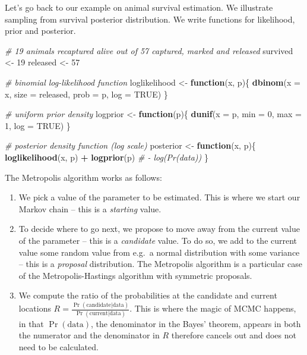 \documentclass[
  12pt,
]{krantz}
\newenvironment{Shaded}{\begin{snugshade}}{\end{snugshade}}
\newcommand{\AttributeTok}[1]{\textcolor[rgb]{0.13,0.29,0.53}{#1}}
\newcommand{\CommentTok}[1]{\textcolor[rgb]{0.56,0.35,0.01}{\textit{#1}}}
\newcommand{\ConstantTok}[1]{\textcolor[rgb]{0.56,0.35,0.01}{#1}}
\newcommand{\ControlFlowTok}[1]{\textcolor[rgb]{0.13,0.29,0.53}{\textbf{#1}}}
\newcommand{\DecValTok}[1]{\textcolor[rgb]{0.00,0.00,0.81}{#1}}
\newcommand{\FunctionTok}[1]{\textcolor[rgb]{0.13,0.29,0.53}{\textbf{#1}}}
\newcommand{\NormalTok}[1]{#1}
\newcommand{\OtherTok}[1]{\textcolor[rgb]{0.56,0.35,0.01}{#1}}
\newcommand{\SpecialCharTok}[1]{\textcolor[rgb]{0.81,0.36,0.00}{\textbf{#1}}}
\begin{document}
Let's go back to our example on animal survival estimation. We illustrate sampling from survival posterior distribution. We write functions for likelihood, prior and posterior.

\begin{Shaded}
\begin{Highlighting}[]
\CommentTok{\# 19 animals recaptured alive out of 57 captured, marked and released}
\NormalTok{survived }\OtherTok{\textless{}{-}} \DecValTok{19}
\NormalTok{released }\OtherTok{\textless{}{-}} \DecValTok{57}

\CommentTok{\# binomial log{-}likelihood function}
\NormalTok{loglikelihood }\OtherTok{\textless{}{-}} \ControlFlowTok{function}\NormalTok{(x, p)\{}
  \FunctionTok{dbinom}\NormalTok{(}\AttributeTok{x =}\NormalTok{ x, }\AttributeTok{size =}\NormalTok{ released, }\AttributeTok{prob =}\NormalTok{ p, }\AttributeTok{log =} \ConstantTok{TRUE}\NormalTok{)}
\NormalTok{\}}

\CommentTok{\# uniform prior density}
\NormalTok{logprior }\OtherTok{\textless{}{-}} \ControlFlowTok{function}\NormalTok{(p)\{}
  \FunctionTok{dunif}\NormalTok{(}\AttributeTok{x =}\NormalTok{ p, }\AttributeTok{min =} \DecValTok{0}\NormalTok{, }\AttributeTok{max =} \DecValTok{1}\NormalTok{, }\AttributeTok{log =} \ConstantTok{TRUE}\NormalTok{)}
\NormalTok{\}}

\CommentTok{\# posterior density function (log scale)}
\NormalTok{posterior }\OtherTok{\textless{}{-}} \ControlFlowTok{function}\NormalTok{(x, p)\{}
  \FunctionTok{loglikelihood}\NormalTok{(x, p) }\SpecialCharTok{+} \FunctionTok{logprior}\NormalTok{(p) }\CommentTok{\# {-} log(Pr(data))}
\NormalTok{\}}
\end{Highlighting}
\end{Shaded}

The Metropolis algorithm works as follows:

\begin{enumerate}
\def\labelenumi{\arabic{enumi}.}
\item
  We pick a value of the parameter to be estimated. This is where we start our Markov chain -- this is a \emph{starting} value.
\item
  To decide where to go next, we propose to move away from the current value of the parameter -- this is a \emph{candidate} value. To do so, we add to the current value some random value from e.g.~a normal distribution with some variance -- this is a \emph{proposal} distribution. The Metropolis algorithm is a particular case of the Metropolis-Hastings algorithm with symmetric proposals.
\item
  We compute the ratio of the probabilities at the candidate and current locations \(R=\displaystyle{\frac{{\Pr(\text{candidate}|\text{data})}}{{\Pr(\text{current}|\text{data})}}}\). This is where the magic of MCMC happens, in that \(\Pr(\text{data})\), the denominator in the Bayes' theorem, appears in both the numerator and the denominator in \(R\) therefore cancels out and does not need to be calculated.
\end{enumerate}
\end{document}
